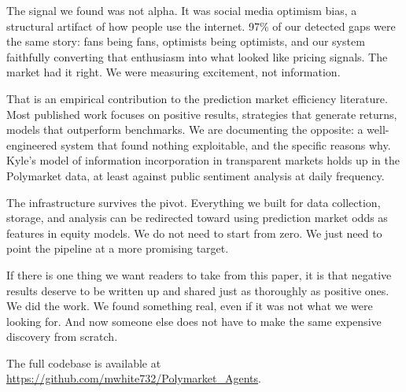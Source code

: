 \documentclass[conference]{IEEEtran}
\begin{document}
The signal we found was not alpha. It was social media optimism bias, a structural artifact of how people use the internet. 97\% of our detected gaps were the same story: fans being fans, optimists being optimists, and our system faithfully converting that enthusiasm into what looked like pricing signals. The market had it right. We were measuring excitement, not information.

That is an empirical contribution to the prediction market efficiency literature. Most published work focuses on positive results, strategies that generate returns, models that outperform benchmarks. We are documenting the opposite: a well-engineered system that found nothing exploitable, and the specific reasons why. Kyle's model of information incorporation in transparent markets holds up in the Polymarket data, at least against public sentiment analysis at daily frequency.

The infrastructure survives the pivot. Everything we built for data collection, storage, and analysis can be redirected toward using prediction market odds as features in equity models. We do not need to start from zero. We just need to point the pipeline at a more promising target.

If there is one thing we want readers to take from this paper, it is that negative results deserve to be written up and shared just as thoroughly as positive ones. We did the work. We found something real, even if it was not what we were looking for. And now someone else does not have to make the same expensive discovery from scratch.

The full codebase is available at \url{https://github.com/mwhite732/Polymarket_Agents}.
\end{document}
